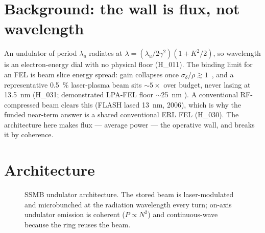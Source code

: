 \documentclass[11pt,a4paper]{article}
\newcommand{\hyp}[1]{\textcolor{blue!45!black}{\textsf{\small #1}}}
\begin{document}
\section{Background: the wall is flux, not wavelength}
An undulator of period $\lambda_u$ radiates at $\lambda=(\lambda_u/2\gamma^{2})(1+K^{2}/2)$, so
wavelength is an electron-energy dial with no physical floor (\hyp{H\_011}). The binding limit for an
FEL is beam slice energy spread: gain collapses once $\sigma_\delta/\rho\gtrsim1$~\citep{mingxie},
and a representative \SI{0.5}{\percent} laser-plasma beam sits $\sim\!5\times$ over budget, never
lasing at \SI{13.5}{\nano\meter} (\hyp{H\_031}; demonstrated LPA-FEL floor $\sim$\SI{25}{\nano\meter}
\citep{xiao2026}). A conventional RF-compressed beam clears this (FLASH lased \SI{13}{\nano\meter},
2006), which is why the funded near-term answer is a shared conventional ERL FEL (\hyp{H\_030}). The
architecture here makes flux --- average power --- the operative wall, and breaks it by coherence.

\section{Architecture}
\label{sec:arch}
\begin{figure}[t]
\centering
{}
\caption{SSMB undulator architecture. The stored beam is laser-modulated and microbunched at the
radiation wavelength every turn; on-axis undulator emission is coherent ($P\!\propto\!N^2$) and
continuous-wave because the ring reuses the beam.}
\label{fig:arch}
\end{figure}
\end{document}

